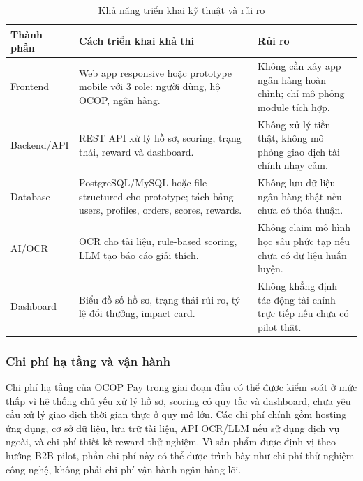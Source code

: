 \documentclass[13pt,a4paper]{extarticle}
\begin{document}
\begin{table}[H]
\centering
\caption{Khả năng triển khai kỹ thuật và rủi ro}
\begin{tabular}{|l|p{5cm}|p{5cm}|}
\hline
\textbf{Thành phần} & \textbf{Cách triển khai khả thi} & \textbf{Rủi ro} \\
\hline
Frontend & Web app responsive hoặc prototype mobile với 3 role: người dùng, hộ OCOP, ngân hàng. & Không cần xây app ngân hàng hoàn chỉnh; chỉ mô phỏng module tích hợp. \\
\hline
Backend/API & REST API xử lý hồ sơ, scoring, trạng thái, reward và dashboard. & Không xử lý tiền thật, không mô phỏng giao dịch tài chính nhạy cảm. \\
\hline
Database & PostgreSQL/MySQL hoặc file structured cho prototype; tách bảng users, profiles, orders, scores, rewards. & Không lưu dữ liệu ngân hàng thật nếu chưa có thỏa thuận. \\
\hline
AI/OCR & OCR cho tài liệu, rule-based scoring, LLM tạo báo cáo giải thích. & Không claim mô hình học sâu phức tạp nếu chưa có dữ liệu huấn luyện. \\
\hline
Dashboard & Biểu đồ số hồ sơ, trạng thái rủi ro, tỷ lệ đổi thưởng, impact card. & Không khẳng định tác động tài chính trực tiếp nếu chưa có pilot thật. \\
\hline
\end{tabular}
\end{table}

\subsubsection{Chi phí hạ tầng và vận hành}

Chi phí hạ tầng của OCOP Pay trong giai đoạn đầu có thể được kiểm soát ở mức thấp vì hệ thống chủ yếu xử lý hồ sơ, scoring có quy tắc và dashboard, chưa yêu cầu xử lý giao dịch thời gian thực ở quy mô lớn. Các chi phí chính gồm hosting ứng dụng, cơ sở dữ liệu, lưu trữ tài liệu, API OCR/LLM nếu sử dụng dịch vụ ngoài, và chi phí thiết kế reward thử nghiệm. Vì sản phẩm được định vị theo hướng B2B pilot, phần chi phí này có thể được trình bày như chi phí thử nghiệm công nghệ, không phải chi phí vận hành ngân hàng lõi.
\end{document}
